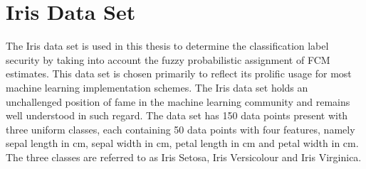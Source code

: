 \section{Iris Data Set}
The Iris data set\cite{fisher1936use} is used in this thesis to determine the classification label security by taking into account the fuzzy probabilistic assignment of FCM estimates. This data set is chosen primarily to reflect its prolific usage for most machine learning implementation schemes. The Iris data set holds an unchallenged position of fame in the machine learning community and remains well understood in such regard. The data set has 150 data points present with three uniform classes, each containing 50 data points with four features, namely sepal length in cm, sepal width in cm, petal length in cm and petal width in cm. The three classes are referred to as Iris Setosa, Iris Versicolour and Iris Virginica.




